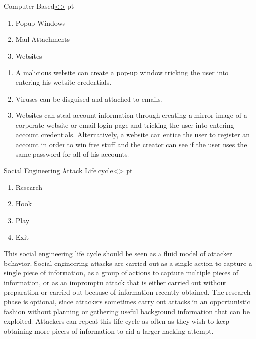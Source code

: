 \documentclass[12pt]{extarticle}
\newenvironment{instructionblock}{\Large\bgroup}{\egroup}
\begin{document}
\pagebreak

\begin{slide}{Computer Based}{\hyperref[slide 8]{\textless}\hyperref[slide 10]{\textgreater}}
	 pt
	\begin{instructionblock}
		\begin{enumerate}
			\item Popup Windows
			\item Mail Attachments
			\item Websites
		\end{enumerate}
	\end{instructionblock}
\end{slide}
\begin{enumerate}
	\item A malicious website can create a pop-up window tricking the user into entering his website credentials.\cite{b7}
	\item Viruses can be disguised and attached to emails.\cite{b7}
	\item Websites can steal account information through creating a mirror image of a corporate website or email login page and tricking the user into entering account credentials. Alternatively, a website can entice the user to register an account in order to win free stuff and the creator can see if the user uses the same password for all of his accounts.\cite{b7}
\end{enumerate}


\pagebreak

\begin{slide}{Social Engineering Attack Life cycle}{\hyperref[slide 9]{\textless}\hyperref[slide 11]{\textgreater}}
	 pt
	\begin{instructionblock}
		\begin{enumerate}
			\item Research
			\item Hook
			\item Play
			\item Exit
		\end{enumerate}
	\end{instructionblock}
\end{slide}

This social engineering life cycle should be seen as a fluid model of attacker behavior. Social engineering attacks are carried out as a single action to capture a single piece of information, as a group of actions to capture multiple pieces of information, or as an impromptu attack that is either carried out without preparation or carried out because of information recently obtained. The research phase is optional, since attackers sometimes carry out attacks in an opportunistic fashion without planning or gathering useful background information that can be exploited. Attackers can repeat this life cycle as often as they wish to keep obtaining more pieces of information to aid a larger hacking attempt.\cite{b2}
\end{document}
